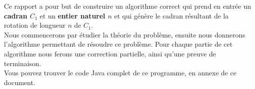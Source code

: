 Ce rapport a pour but de construire un algorithme correct qui prend en entrée un \textbf{cadran $C_{1}$} et un \textbf{entier naturel $n$} et qui génère le cadran résultant de la rotation de longueur $n$ de $C_{1}$.\\

Nous commencerons par étudier la théorie du problème, ensuite nous donnerons l'algorithme permettant de résoudre ce problème. Pour chaque partie de cet algorithme nous  ferons une correction partielle, ainsi qu'une preuve de terminaison. \\

Vous pouvez trouver le code Java complet de ce programme, en annexe de ce document. \\